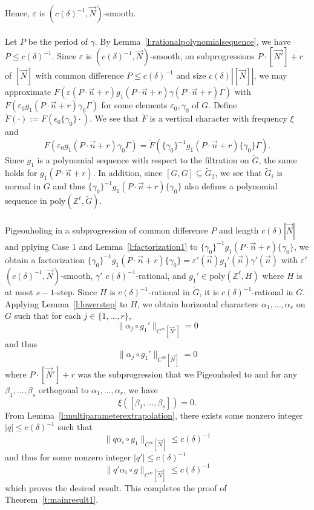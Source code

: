 \documentclass[11pt, a4paper]{amsart}
\theoremstyle{plain}
\theoremstyle{plain}
\theoremstyle{definition}
\theoremstyle{remark}
\numberwithin{equation}{section}
\numberwithin{lemma}{section}
\numberwithin{proposition}{section}
\numberwithin{corollary}{section}
\numberwithin{definition}{section}
\numberwithin{claim}{section}
\begin{document}
Hence, $\varepsilon$ is $(c(\delta)^{-1}, \vec{N})$-smooth. \\\\
Let $P$ be the period of $\gamma$. By Lemma~\ref{l:rationalpolynomialsequence}, we have $P \le c(\delta)^{-1}$. Since $\varepsilon$ is $(c(\delta)^{-1}, \vec{N})$-smooth, on subprogressions $P \cdot [\vec{N'}] + r$ of $[\vec{N}]$ with common difference $P \le c(\delta)^{-1}$ and size $c(\delta)|[\vec{N}]|$, we may approximate $F(\varepsilon(P \cdot \vec{n} + r)g_1(P \cdot \vec{n} + r)\gamma(P \cdot \vec{n} + r)\Gamma)$ with $F(\varepsilon_0 g_1(P \cdot \vec{n} + r) \gamma_0\Gamma)$ for some elements $\varepsilon_0, \gamma_0$ of $G$. Define $\tilde{F}(\cdot) := F(\epsilon_0 \{\gamma_0\} \cdot )$. We see that $\tilde{F}$ is a vertical character with frequency $\xi$ and
$$F(\varepsilon_0 g_1(P \cdot \vec{n} + r) \gamma_0\Gamma) = \tilde{F}(\{\gamma_0\}^{-1}g_1(P \cdot \vec{n} + r)\{\gamma_0\}\Gamma).$$
Since $g_1$ is a polynomial sequence with respect to the filtration on $\tilde{G}$, the same holds for $g_1(P \cdot \vec{n} + r)$. In addition, since $[G, G] \subseteq \tilde{G}_2$, we see that $\tilde{G}_i$ is normal in $G$ and thus $\{\gamma_0\}^{-1} g_1(P \cdot \vec{n} + r) \{\gamma_0\}$ also defines a polynomial sequence in $\mathrm{poly}(\mathbb{Z}^\ell, \tilde{G})$. \\\\
Pigeonholing in a subprogression of common difference $P$ and length $c(\delta)|\vec{N}|$ and pplying Case 1 and Lemma~\ref{l:factorization1} to $\{\gamma_0\}^{-1} g_1(P \cdot \vec{n} + r)\{\gamma_0\}$, we obtain a factorization $\{\gamma_0\}^{-1} g_1(P \cdot \vec{n} + r)\{\gamma_0\} = \varepsilon'(\vec{n}) g_1'(\vec{n}) \gamma'(\vec{n})$ with $\varepsilon'$ $(c(\delta)^{-1}, \vec{N})$-smooth, $\gamma'$ $c(\delta)^{-1}$-rational, and $g_1' \in \mathrm{poly}(\mathbb{Z}^\ell, H)$ where $H$ is at most $s - 1$-step. Since $H$ is $c(\delta)^{-1}$-rational in $\tilde{G}$, it is $c(\delta)^{-1}$-rational in $G$. Applying Lemma~\ref{l:lowerstep} to $H$, we obtain horizontal characters $\alpha_1, \dots, \alpha_r$ on $G$ such that for each $j \in \{1, \dots, r\}$,
$$\|\alpha_j \circ g_1'\|_{C^\infty[\vec{N}']} = 0$$
and thus
$$\|\alpha_j \circ g_1'\|_{C^\infty[\vec{N}]} = 0$$
where $P \cdot [\vec{N}'] + r$ was the subprogression that we Pigeonholed to and for any $\beta_1, \dots, \beta_s$ orthogonal to $\alpha_1, \dots, \alpha_r$, we have
$$\xi([\beta_1, \dots, \beta_s]) = 0.$$
From Lemma~\ref{l:multiparameterextrapolation}, there exists some nonzero integer $|q| \le c(\delta)^{-1}$ such that
$$\|q\alpha_i \circ g_1\|_{C^\infty[\vec{N}]} \le c(\delta)^{-1}$$
and thus for some nonzero integer $|q'| \le c(\delta)^{-1}$
$$\|q'\alpha_i \circ g\|_{C^\infty[\vec{N}]} \le c(\delta)^{-1}$$
which proves the desired result. This completes the proof of Theorem~\ref{t:mainresult1}.
\end{document}
